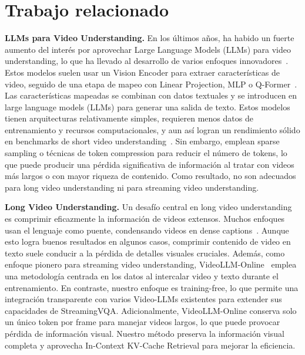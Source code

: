 \section{Trabajo relacionado}
\label{sec:related_work}

\noindent\textbf{LLMs para Video Understanding.} 
En los últimos años, ha habido un fuerte aumento del interés por aprovechar Large Language Models (LLMs) para video understanding, lo que ha llevado al desarrollo de varios enfoques innovadores~\citep{video_chatgpt, llava_next_video, llava_onevision}. Estos modelos suelen usar un Vision Encoder para extraer características de video, seguido de una etapa de mapeo con Linear Projection, MLP o Q-Former~\citep{blip2}. Las características mapeadas se combinan con datos textuales y se introducen en large language models (LLMs) para generar una salida de texto. Estos modelos tienen arquitecturas relativamente simples, requieren menos datos de entrenamiento y recursos computacionales, y aun así logran un rendimiento sólido en benchmarks de short video understanding~\citep{msrvtt_qa, next_qa, li2024mvbench}. Sin embargo, emplean sparse sampling o técnicas de token compression para reducir el número de tokens, lo que puede producir una pérdida significativa de información al tratar con videos más largos o con mayor riqueza de contenido. Como resultado, no son adecuados para long video understanding ni para streaming video understanding.

\noindent\textbf{Long Video Understanding.} 
Un desafío central en long video understanding es comprimir eficazmente la información de videos extensos. Muchos enfoques usan el lenguaje como puente, condensando videos en dense captions~\citep{llovi,video_recap,streaming_dvc}. Aunque esto logra buenos resultados en algunos casos, comprimir contenido de video en texto suele conducir a la pérdida de detalles visuales cruciales. Además, como enfoque pionero para streaming video understanding, VideoLLM-Online~\citep{videollm_online} emplea una metodología centrada en los datos al intercalar video y texto durante el entrenamiento. En contraste, nuestro enfoque es training-free, lo que permite una integración transparente con varios Video-LLMs existentes para extender sus capacidades de StreamingVQA. Adicionalmente, VideoLLM-Online conserva solo un único token por frame para manejar videos largos, lo que puede provocar pérdida de información visual. Nuestro método preserva la información visual completa y aprovecha In-Context KV-Cache Retrieval para mejorar la eficiencia.

